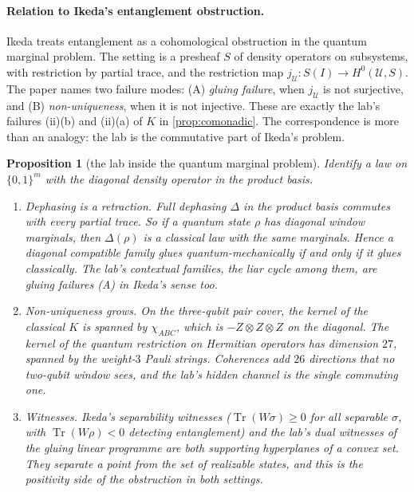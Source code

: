 \documentclass[11pt]{article}
\newtheorem{proposition}{Proposition}\newtheorem{corollary}{Corollary}\newtheorem{lemma}{Lemma}
\theoremstyle{definition}\newtheorem{definition}{Definition}\newtheorem{remark}{Remark}
\begin{document}
\paragraph{Relation to Ikeda's entanglement obstruction.} Ikeda \cite{Ikeda2025} treats entanglement as a cohomological obstruction
in the quantum marginal problem. The setting is a presheaf $S$ of density operators on subsystems, with restriction by partial trace,
and the restriction map $j_{\mathcal U}:S(I)\to H^0(\mathcal U,S)$. The paper names two failure modes: (A) \emph{gluing failure}, when
$j_{\mathcal U}$ is not surjective, and (B) \emph{non-uniqueness}, when it is not injective. These are exactly the lab's failures
(ii)(b) and (ii)(a) of $K$ in \cref{prop:comonadic}. The correspondence is more than an analogy: the lab is the commutative part of
Ikeda's problem.

\begin{proposition}[the lab inside the quantum marginal problem]\label{prop:quantum}
Identify a law on $\{0,1\}^m$ with the diagonal density operator in the product basis.
\begin{enumerate}
\item[(1)] \emph{Dephasing is a retraction.} Full dephasing $\Delta$ in the product basis commutes with every partial trace. So if a quantum
  state $\rho$ has diagonal window marginals, then $\Delta(\rho)$ is a classical law with the same marginals. Hence a diagonal compatible
  family glues quantum-mechanically if and only if it glues classically. The lab's contextual families, the liar cycle among them, are
  gluing failures (A) in Ikeda's sense too.
\item[(2)] \emph{Non-uniqueness grows.} On the three-qubit pair cover, the kernel of the classical $K$ is spanned by $\chi_{ABC}$, which is
  $-Z\otimes Z\otimes Z$ on the diagonal. The kernel of the quantum restriction on Hermitian operators has dimension $27$, spanned by the
  weight-$3$ Pauli strings. Coherences add $26$ directions that no two-qubit window sees, and the lab's hidden channel is the single
  commuting one.
\item[(3)] \emph{Witnesses.} Ikeda's separability witnesses ($\operatorname{Tr}(W\sigma)\ge0$ for all separable $\sigma$, with
  $\operatorname{Tr}(W\rho)<0$ detecting entanglement) and the lab's dual witnesses of the gluing linear programme are both supporting
  hyperplanes of a convex set. They separate a point from the set of realizable states, and this is the positivity side of the
  obstruction in both settings.
\end{enumerate}
\end{proposition}
\end{document}
